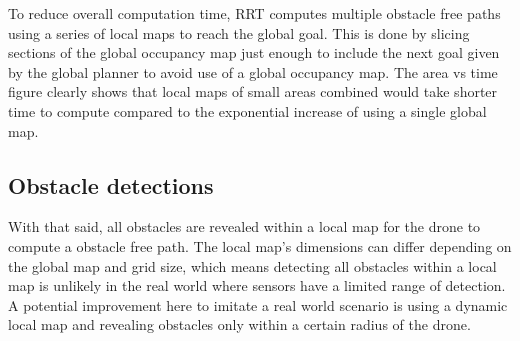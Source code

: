 To reduce overall computation time, RRT computes multiple obstacle free paths
using a series of local maps to reach the global goal. This is done by slicing sections of the global occupancy map just enough to include the next goal given by the global planner to avoid use of a global occupancy map. The area vs time figure clearly shows that local maps of small areas combined would take shorter time to compute compared to the exponential increase of using a single global map.

\subsection{Obstacle detections}
With that said, all obstacles are revealed within a local map for the drone to compute a obstacle free path. The local map's dimensions can differ depending on the global map and grid size, which means detecting all obstacles within a local map is unlikely in the real world where sensors have a limited range of detection. \\
 A potential improvement here to imitate a real world scenario is using a dynamic local map and revealing obstacles only within a certain radius of the drone.

